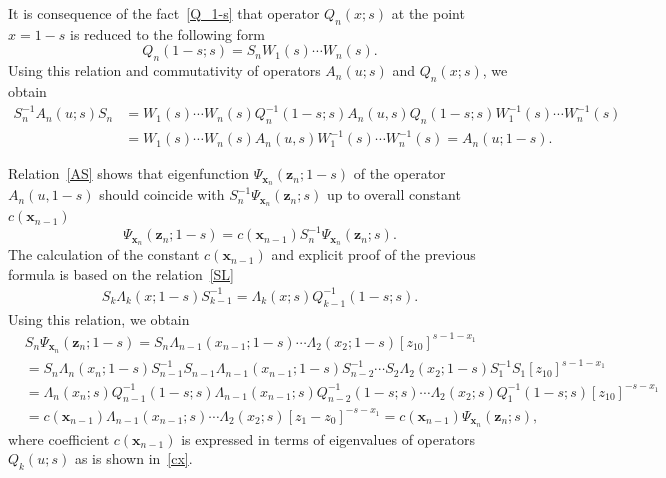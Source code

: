 \documentclass[pdftex]{sigma}
\numberwithin{equation}{section}
\begin{document}
It is consequence of the fact~\eqref{Q_1-s} that operator
$Q_n(x; s)$ at the point $x=1-s$ is reduced to the
following form
\begin{equation*}
	Q_n(1-s; s) = S_n W_1(s) \cdots W_n(s) .
\end{equation*}
Using this relation and commutativity of operators
$A_n(u;s)$ and $Q_n(x; s)$, we obtain
\begin{align*}
S^{-1}_n A_n(u;s) S_n
& =
W_1(s)\cdots W_n(s) Q^{-1}_n(1-s; s)
A_n(u,s) Q_n(1-s; s)
W^{-1}_1(s)\cdots W^{-1}_n(s) \\
& =
W_1(s)\cdots W_n(s)
A_n(u,s) W^{-1}_1(s)\cdots W^{-1}_n(s) = A_n(u;1-s) .
\end{align*}

Relation~\eqref{AS} shows that eigenfunction $\Psi_{\bm x_n}(\bm z_n;1-s)$
of the operator $A_n(u,1-s)$ should coincide with
$S^{-1}_n\Psi_{\bm x_n}(\bm z_n;s)$ up to overall constant $c(\bm x_{n-1})$
\begin{equation*}
\Psi_{\bm x_n}(\bm z_n;1-s) = c(\bm x_{n-1})
S^{-1}_n \Psi_{\bm x_n}(\bm z_n;s) .
\end{equation*}
The calculation of the constant $c(\bm x_{n-1})$ and explicit proof
of the previous formula is based on the relation~\eqref{SL}
\begin{align*}
S_k \Lambda_k(x;1-s) S^{-1}_{k-1} =
\Lambda_k(x;s) Q^{-1}_{k-1}(1-s;s) .
\end{align*}
Using this relation, we obtain
\begin{align*}
&
S_n \Psi_{\bm{x}_n}(\bm z_n;1-s ) =
S_n \Lambda_{n-1}( x_{n-1};1-s)\cdots
\Lambda_{2}( x_{2};1-s) [z_{10}]^{s-1-x_1} \\
& =\!
S_n \Lambda_n(x_n;1-s) S^{-1}_{n-1}
S_{n-1}\Lambda_{n-1}( x_{n-1};1-s) S^{-1}_{n-2}\cdots
S_{2} \Lambda_{2}( x_{2};1-s) S^{-1}_{1} S_{1} [z_{10}]^{s-1-x_1} \\
& =\!
\Lambda_n(x_n;s) Q^{-1}_{n-1}(1-s;s)
\Lambda_{n-1}( x_{n-1};s) Q^{-1}_{n-2}(1-s;s)\cdots
\Lambda_{2}( x_{2};s) Q^{-1}_{1}(1-s;s) [z_{10}]^{-s-x_1} \\
& =\!
c(\bm x_{n-1})
\Lambda_{n-1}( x_{n-1};s)\cdots
\Lambda_{2}( x_{2};s) [z_1-z_0]^{-s-x_1} =
c(\bm x_{n-1}) \Psi_{\bm{x}_n}(\bm z_n; s) ,
\end{align*}
where coefficient $c(\bm x_{n-1})$ is expressed in terms of
eigenvalues of operators $Q_k(u;s)$ as is shown in~\eqref{cx}.
\end{document}
